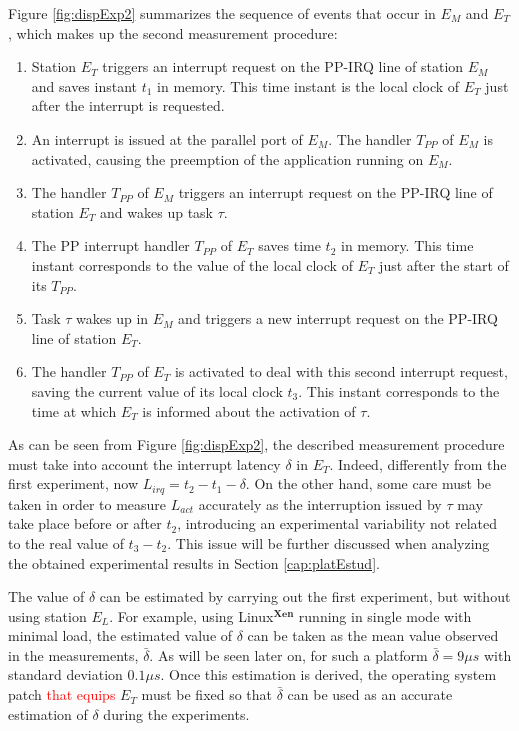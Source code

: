 \documentclass{acm_proc_article-sp}
\newcommand{\col}[1]{\textcolor{red}{#1}}
\begin{document}
Figure \ref{fig:dispExp2} summarizes the sequence of events that occur in $E_M$ and
$E_T$, which makes up the second measurement procedure:

\begin{enumerate}
\item Station $E_T$ triggers an interrupt request on the PP-IRQ line of station
  $E_M$ and saves instant $t_1$ in memory. This time instant is the local clock of
  $E_T$ just after the interrupt is requested.
 
\item An interrupt is issued at the parallel port of $E_M$. The handler
  $T_{PP}$ of $E_M$ is activated, causing the preemption of the application running on
  $E_M$.

\item The handler $T_{PP}$ of $E_M$ triggers an interrupt request on the PP-IRQ line
  of station $E_T$ and wakes up task $\tau$.
  
\item The PP interrupt handler $T_{PP}$ of $E_T$ saves time $t_2$ in memory.
  This time instant corresponds to the value of the local clock of $E_T$ just after
  the start of its $T_{PP}$.
  
\item Task $\tau$ wakes up in $E_M$ and triggers a new interrupt request on the
  PP-IRQ line of station $E_T$.
  
\item The handler $T_{PP}$ of $E_T$ is activated to deal with this second interrupt
  request, saving the current value of its local clock $t_3$. This instant
  corresponds to the time at which $E_T$ is informed about the activation of $\tau$.
\end{enumerate}

As can be seen from Figure \ref{fig:dispExp2}, the described measurement procedure
must take into account the interrupt latency $\delta$ in $E_T$. Indeed, differently
from the first experiment, now $L_{irq} = t_2 - t_1 - \delta$.  On the other hand,
some care must be taken in order to measure $L_{act}$ accurately as the
interruption issued by $\tau$ may take place before or after $t_2$, introducing an
experimental variability not related to the real value of $t_3 - t_2$. This issue
will be further discussed when analyzing the obtained experimental results in
Section \ref{cap:platEstud}.

The value of $\delta$ can be estimated by carrying out the first experiment, but
without using station $E_L$. For example, using Linux$^{\mathbf{Xen}}$ running in
single mode with minimal load, the estimated value of $\delta$ can be taken as the
mean value observed in the measurements, $\bar{\delta}$. As will be seen later on,
for such a platform $\bar{\delta} = 9 \mu s$ with standard deviation $0.1 \mu
s$. Once this estimation is derived, the operating system patch \col{that equips}
$E_T$ must be fixed so that $\bar{\delta}$ can be used as an accurate estimation of
$\delta$ during the experiments.
\end{document}
